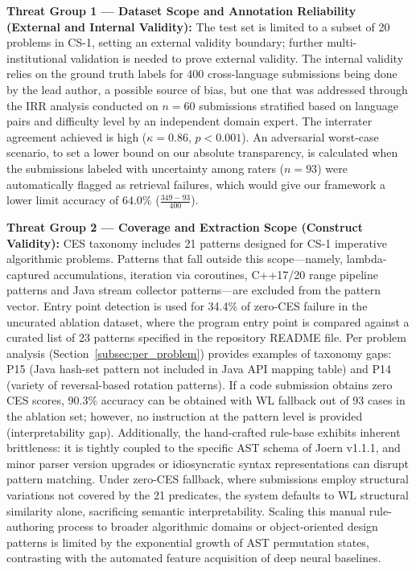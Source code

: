 \textbf{Threat Group 1 --- Dataset Scope and Annotation Reliability (External and Internal Validity):}
The test set is limited to a subset of 20 problems in CS-1, setting an external validity boundary; further multi-institutional validation is needed to prove external validity. The internal validity relies on the ground truth labels for 400 cross-language submissions being done by the lead author, a possible source of bias, but one that was addressed through the IRR analysis conducted on $n=60$ submissions stratified based on language pairs and difficulty level by an independent domain expert. The interrater agreement achieved is high ($\kappa = 0.86$, $p < 0.001$). An adversarial worst-case scenario, to set a lower bound on our absolute transparency, is calculated when the submissions labeled with uncertainty among raters ($n=93$) were automatically flagged as retrieval failures, which would give our framework a lower limit accuracy of $64.0\%$ ($\frac{349-93}{400}$).

\textbf{Threat Group 2 --- Coverage and Extraction Scope (Construct Validity):}
CES taxonomy includes 21 patterns designed for CS-1 imperative algorithmic problems. Patterns that fall outside this scope---namely, lambda-captured accumulations, iteration via coroutines, C++17/20 range pipeline patterns and Java stream collector patterns---are excluded from the pattern vector. Entry point detection is used for 34.4\% of zero-CES failure in the uncurated ablation dataset, where the program entry point is compared against a curated list of 23 patterns specified in the repository README file. Per problem analysis (Section~\ref{subsec:per_problem}) provides examples of taxonomy gaps: P15 (Java hash-set pattern not included in Java API mapping table) and P14 (variety of reversal-based rotation patterns). If a code submission obtains zero CES scores, 90.3\% accuracy can be obtained with WL fallback out of 93 cases in the ablation set; however, no instruction at the pattern level is provided (interpretability gap). Additionally, the hand-crafted rule-base exhibits inherent brittleness: it is tightly coupled to the specific AST schema of Joern v1.1.1, and minor parser version upgrades or idiosyncratic syntax representations can disrupt pattern matching. Under zero-CES fallback, where submissions employ structural variations not covered by the 21 predicates, the system defaults to WL structural similarity alone, sacrificing semantic interpretability. Scaling this manual rule-authoring process to broader algorithmic domains or object-oriented design patterns is limited by the exponential growth of AST permutation states, contrasting with the automated feature acquisition of deep neural baselines.

